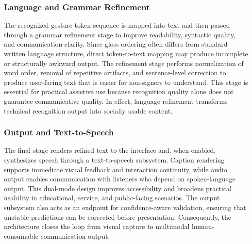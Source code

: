 \subsubsection{Language and Grammar Refinement}
The recognized gesture token sequence is mapped into text and then passed through a grammar refinement stage to improve readability, syntactic quality, and communication clarity. Since gloss ordering often differs from standard written language structure, direct token-to-text mapping may produce incomplete or structurally awkward output. The refinement stage performs normalization of word order, removal of repetitive artifacts, and sentence-level correction to produce user-facing text that is easier for non-signers to understand. This stage is essential for practical assistive use because recognition quality alone does not guarantee communicative quality. In effect, language refinement transforms technical recognition output into socially usable content.

\subsubsection{Output and Text-to-Speech}
The final stage renders refined text to the interface and, when enabled, synthesizes speech through a text-to-speech subsystem. Caption rendering supports immediate visual feedback and interaction continuity, while audio output enables communication with listeners who depend on spoken-language output. This dual-mode design improves accessibility and broadens practical usability in educational, service, and public-facing scenarios. The output subsystem also acts as an endpoint for confidence-aware validation, ensuring that unstable predictions can be corrected before presentation. Consequently, the architecture closes the loop from visual capture to multimodal human-consumable communication output.
